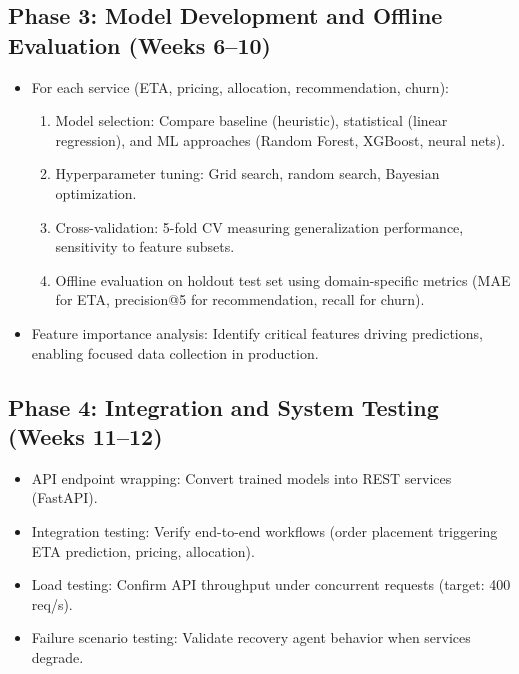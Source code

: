 \documentclass[12pt,a4paper]{report}
\begin{document}
\subsection{Phase 3: Model Development and Offline Evaluation (Weeks 6--10)}
\begin{itemize}
    \item For each service (ETA, pricing, allocation, recommendation, churn):
    \begin{enumerate}
        \item Model selection: Compare baseline (heuristic), statistical (linear regression), and ML approaches (Random Forest, XGBoost, neural nets).
        \item Hyperparameter tuning: Grid search, random search, Bayesian optimization.
        \item Cross-validation: 5-fold CV measuring generalization performance, sensitivity to feature subsets.
        \item Offline evaluation on holdout test set using domain-specific metrics (MAE for ETA, precision@5 for recommendation, recall for churn).
    \end{enumerate}
    \item Feature importance analysis: Identify critical features driving predictions, enabling focused data collection in production.
\end{itemize}

\subsection{Phase 4: Integration and System Testing (Weeks 11--12)}
\begin{itemize}
    \item API endpoint wrapping: Convert trained models into REST services (FastAPI).
    \item Integration testing: Verify end-to-end workflows (order placement triggering ETA prediction, pricing, allocation).
    \item Load testing: Confirm API throughput under concurrent requests (target: 400 req/s).
    \item Failure scenario testing: Validate recovery agent behavior when services degrade.
\end{itemize}
\end{document}
